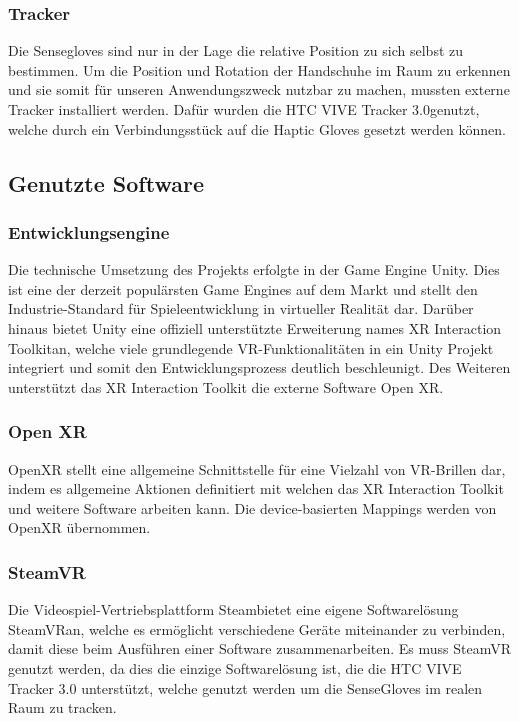\subsubsection{Tracker}
Die Sensegloves sind nur in der Lage die relative Position zu sich selbst zu bestimmen. Um die Position und Rotation der Handschuhe im Raum zu erkennen und sie somit für unseren Anwendungszweck nutzbar zu machen, mussten externe Tracker installiert werden. Dafür wurden die \dq HTC VIVE Tracker 3.0\dq genutzt, welche durch ein Verbindungsstück auf die Haptic Gloves gesetzt werden können.

\subsection{Genutzte Software}

\subsubsection{Entwicklungsengine}
Die technische Umsetzung des Projekts erfolgte in der Game Engine \dq Unity\dq. Dies ist eine der derzeit populärsten Game Engines auf dem Markt und stellt den Industrie-Standard für Spieleentwicklung in virtueller Realität dar. Darüber hinaus bietet Unity eine offiziell unterstützte Erweiterung names \dq XR Interaction Toolkit\dq an, welche viele grundlegende VR-Funktionalitäten in ein Unity Projekt integriert und somit den Entwicklungsprozess deutlich beschleunigt. Des Weiteren unterstützt das XR Interaction Toolkit die externe Software \dq Open XR\dq.

\subsubsection{Open XR}
OpenXR stellt eine allgemeine Schnittstelle für eine Vielzahl von VR-Brillen dar, indem es allgemeine Aktionen definitiert mit welchen das XR Interaction Toolkit und weitere Software arbeiten kann. Die device-basierten Mappings werden von OpenXR übernommen. 

\subsubsection{SteamVR}
Die Videospiel-Vertriebsplattform \dq Steam\dq bietet eine eigene Softwarelösung \dq SteamVR\dq an, welche es ermöglicht verschiedene Geräte miteinander zu verbinden, damit diese beim Ausführen einer Software zusammenarbeiten. Es muss SteamVR genutzt werden, da dies die einzige Softwarelösung ist, die die HTC VIVE Tracker 3.0 unterstützt, welche genutzt werden um die SenseGloves im realen Raum zu tracken.

